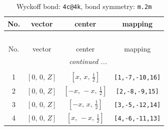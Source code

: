 \documentclass[fleqn,8pt]{jsarticle}
\begin{document}
\renewcommand{\arraystretch}{1.2}
\begin{longtable}{cccc}
\caption{Wyckoff bond: {\tt 4c@4k}, bond symmetry: {\tt m.2m}}
 \\
 \hline \hline
No. & vector & center & mapping \\ \hline \endfirsthead

\multicolumn{3}{l}{\tablename\ \thetable{}} \\
 \hline \hline
No. & vector & center & mapping \\ \hline \endhead

 \hline \hline
\multicolumn{3}{r}{\footnotesize\it continued ...} \\ \endfoot

 \hline \hline
\multicolumn{3}{r}{} \\ \endlastfoot

1 & $\left[ 0,\, 0,\, Z \right]$ & $\left[ x,\, x,\, \frac{1}{2} \right]$ & {\tt [1,-7,-10,16]} \\ \hline
2 & $\left[ 0,\, 0,\, Z \right]$ & $\left[ - x,\, - x,\, \frac{1}{2} \right]$ & {\tt [2,-8,-9,15]} \\ \hline
3 & $\left[ 0,\, 0,\, Z \right]$ & $\left[ - x,\, x,\, \frac{1}{2} \right]$ & {\tt [3,-5,-12,14]} \\ \hline
4 & $\left[ 0,\, 0,\, Z \right]$ & $\left[ x,\, - x,\, \frac{1}{2} \right]$ & {\tt [4,-6,-11,13]} \\
\end{longtable}
\renewcommand{\arraystretch}{1.2}
\end{document}
